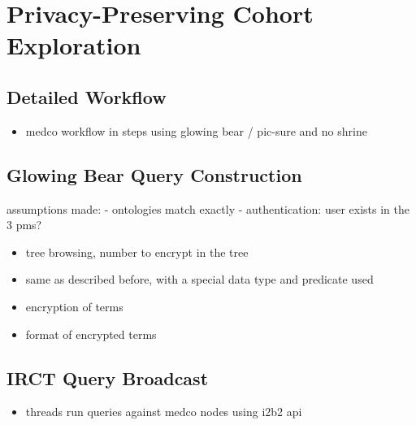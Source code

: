 \chapter{Privacy-Preserving Cohort Exploration}

\section{Detailed Workflow}

\begin{itemize}
    \item medco workflow in steps using glowing bear / pic-sure and no shrine
\end{itemize}

\section{Glowing Bear Query Construction}

assumptions made:
- ontologies match exactly
- authentication: user exists in the 3 pms?


\begin{itemize}
    \item tree browsing, number to encrypt in the tree
    \item same as described before, with a special data type and predicate used
    \item encryption of terms 
    \item format of encrypted terms
\end{itemize}


\section{IRCT Query Broadcast}
\begin{itemize}
    \item threads run queries against medco nodes using i2b2 api
\end{itemize}

